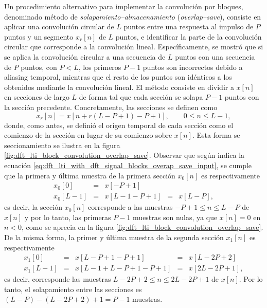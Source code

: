 \documentclass[a4paper]{report}
\begin{document}
Un procedimiento alternativo para implementar la convolución por bloques, denominado método de \emph{solapamiento--almacenamiento} (\emph{overlap--save}), consiste en aplicar una convolución circular de \(L\) puntos entre una respuesta al impulso de \(P\) puntos y un segmento \(x_r[n]\) de \(L\) puntos, e identificar la parte de la convolución circular que corresponde a la convolución lineal. Específicamente, se mostró que si se aplica la convolución circular a una secuencia de \(L\) puntos con una secuencia de \(P\) puntos, con \(P<L\), los primeros \(P-1\) puntos son incorrectos debido a aliasing temporal, mientras que el resto de los puntos son idénticos a los obtenidos mediante la convolución lineal. El método consiste en dividir a \(x[n]\) en secciones de largo \(L\) de forma tal que cada sección se solapa \(P-1\) puntos con la sección precedente. Concretamente, las secciones se definen como
\begin{equation}\label{eq:dft_lti_with_dft_signal_blocks_overap_save_input}
 x_r[n]=x[n+r(L-P+1)-P+1],
 \qquad 0\leq n\leq L-1, 
\end{equation}
donde, como antes, se definió el origen temporal de cada sección como el comienzo de la sección en lugar de su comienzo sobre \(x[n]\). Esta forma se seccionamiento se ilustra en la figura \ref{fig:dft_lti_block_convolution_overlap_save}. Observar que según indica la ecuación \ref{eq:dft_lti_with_dft_signal_blocks_overap_save_input}, se cumple que la primera y última muestra de la primera sección \(x_0[n]\) es respectivamente
\[
 \begin{array}{lclcl}
  x_0[0] &=& x[-P+1]\\
  x_0[L-1]&=&x[L-1-P+1]&=&x[L-P],
 \end{array}
\]
es decir, la sección \(x_0[n]\) corresponde a las muestras \(-P+1\leq n\leq L-P\) de \(x[n]\) y por lo tanto, las primeras \(P-1\) muestras son nulas, ya que \(x[n]=0\) en \(n<0\), como se aprecia en la figura \ref{fig:dft_lti_block_convolution_overlap_save}. De la misma forma, la primer y última muestra de la segunda sección \(x_1[n]\) es respectivamente
\[
 \begin{array}{lclcl}
  x_1[0] &=& x[L-P+1-P+1]&=& x[L-2P+2]\\
  x_1[L-1]&=&x[L-1+L-P+1-P+1]&=&x[2L-2P+1],
 \end{array}
\]
es decir, corresponde las muestras \(L-2P+2\leq n\leq 2L-2P+1\) de \(x[n]\). Por lo tanto, el solapamiento entre las secciones es \((L-P)-(L-2P+2)+1=P-1\) muestras.
\end{document}
